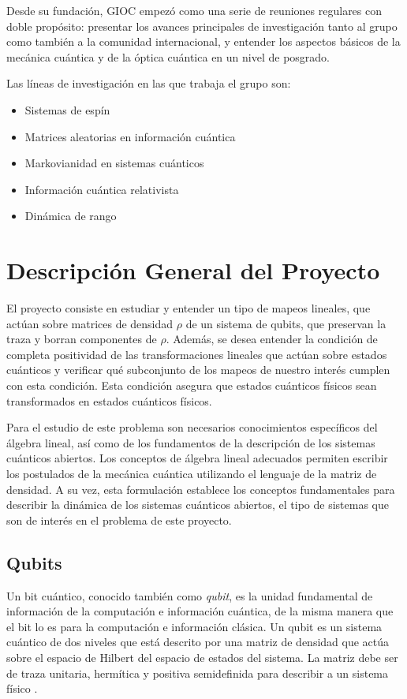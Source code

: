 \documentclass[11pt, spanish, letterpage]{article} %
\newcounter{problem}[section]
\begin{document}
Desde su fundación, GIOC empezó como una serie de reuniones regulares con doble
propósito: presentar los avances principales de investigación tanto al grupo
como también a la comunidad internacional, y entender los aspectos básicos de
la mecánica cuántica y de la óptica cuántica en un nivel de posgrado. 

Las líneas de investigación en las que trabaja el grupo son:
\begin{itemize}
	\item Sistemas de espín
	\item Matrices aleatorias en información cuántica
	\item Markovianidad en sistemas cuánticos
	\item Información cuántica relativista
	\item Dinámica de rango
\end{itemize}
\section{Descripción General del Proyecto}  %
El proyecto consiste en estudiar y entender un tipo de mapeos lineales, que actúan
sobre matrices de densidad $\rho$ de un sistema de qubits, que preservan la traza y
borran componentes de $\rho$. Además, se desea entender la condición de completa
positividad de las transformaciones lineales que actúan sobre estados cuánticos y 
verificar qué subconjunto de los mapeos de nuestro interés cumplen con esta condición.
Esta condición asegura que estados cuánticos físicos sean transformados en estados 
cuánticos físicos. 

Para el estudio de este problema son necesarios conocimientos específicos del
álgebra lineal, así como de los fundamentos de la descripción de los sistemas
cuánticos abiertos. Los conceptos de álgebra lineal adecuados permiten
escribir los postulados de la mecánica cuántica utilizando el lenguaje de la
matriz de densidad. A su vez, esta formulación establece los conceptos
fundamentales para describir la dinámica de los sistemas cuánticos abiertos, el
tipo de sistemas que son de interés en el problema de este proyecto.

\subsection{Qubits} %
Un bit cuántico, conocido también como \textit{qubit}, es la unidad fundamental
de información de la computación e información cuántica, de la misma manera que
el bit lo es para la computación e información clásica. Un qubit es un sistema
cuántico de dos niveles que está descrito por una matriz de densidad que
actúa sobre el espacio de Hilbert del espacio de estados del
sistema. La matriz debe ser de traza unitaria, hermítica y positiva
semidefinida para describir a un sistema físico \cite{nielsen_chuang_2011}. 
\end{document}
